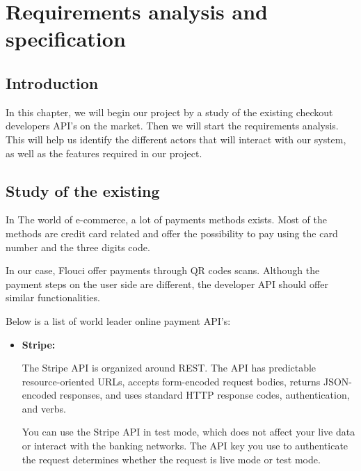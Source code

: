 
\setcounter{chapter}{1}
\chapter{Requirements analysis and specification}
\minitoc %
\graphicspath{{Chapter2/figures/}}


\pagestyle{fancy}
\fancyhf{}
\fancyhead[R]{\bfseries\rightmark}
\fancyfoot[R]{\thepage}
\renewcommand{\headrulewidth}{0.5pt}
\renewcommand{\footrulewidth}{0pt}
\renewcommand{\chaptermark}[1]{\markboth{\MakeUppercase{\chaptername~\thechapter. #1 }}{}}
\renewcommand{\sectionmark}[1]{\markright{\thechapter.\thesection~ #1}}

\begin{spacing}{1.2}
\section*{Introduction}
In this chapter, we will begin our project by a study of the existing checkout developers API's on the market. Then we will start the requirements analysis. This will help us identify the different actors that will interact with our system, as well as the features required in our project.
\section{Study of the existing}
In The world of e-commerce, a lot of payments methods exists.  Most of the methods are credit card related and offer the possibility to pay using the card number and the three digits code.

In our case, Flouci offer payments through QR codes scans. Although the payment steps on the user side are different, the developer API should offer similar functionalities.


Below is a list of world leader online payment API's:
\begin{itemize}
  \item \textbf{Stripe:}

 The Stripe\cite{stripe} API is organized around REST. The API has predictable resource-oriented URLs, accepts form-encoded request bodies, returns JSON-encoded responses, and uses standard HTTP response codes, authentication, and verbs.

You can use the Stripe API in test mode, which does not affect your live data or interact with the banking networks. The API key you use to authenticate the request determines whether the request is live mode or test mode.


\end{itemize}
\end{spacing}
